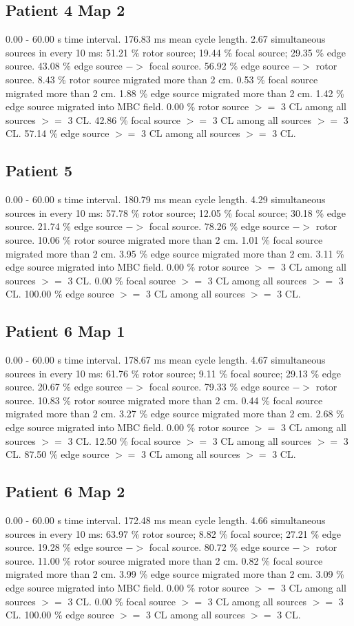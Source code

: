 \documentclass[journal,onecolumn]{IEEEtran} %
\begin{document}
\subsection{Patient 4 Map 2}
0.00 - 60.00 s time interval.
176.83 ms mean cycle length.
2.67 simultaneous sources in every 10 ms:
51.21 \% rotor source;
19.44 \% focal source;
29.35 \% edge source.
43.08 \% edge source $->$ focal source.
56.92 \% edge source $->$ rotor source.
8.43 \% rotor source migrated more than 2 cm.
0.53 \% focal source migrated more than 2 cm.
1.88 \% edge source migrated more than 2 cm.
1.42 \% edge source migrated into MBC field.
0.00 \% rotor source $>=$ 3 CL among all sources $>=$ 3 CL.
42.86 \% focal source $>=$ 3 CL among all sources $>=$ 3 CL.
57.14 \% edge source $>=$ 3 CL among all sources $>=$ 3 CL.

\subsection{Patient 5}
0.00 - 60.00 s time interval.
180.79 ms mean cycle length.
4.29 simultaneous sources in every 10 ms:
57.78 \% rotor source;
12.05 \% focal source;
30.18 \% edge source.
21.74 \% edge source $->$ focal source.
78.26 \% edge source $->$ rotor source.
10.06 \% rotor source migrated more than 2 cm.
1.01 \% focal source migrated more than 2 cm.
3.95 \% edge source migrated more than 2 cm.
3.11 \% edge source migrated into MBC field.
0.00 \% rotor source $>=$ 3 CL among all sources $>=$ 3 CL.
0.00 \% focal source $>=$ 3 CL among all sources $>=$ 3 CL.
100.00 \% edge source $>=$ 3 CL among all sources $>=$ 3 CL.

\subsection{Patient 6 Map 1}
0.00 - 60.00 s time interval.
178.67 ms mean cycle length.
4.67 simultaneous sources in every 10 ms:
61.76 \% rotor source;
9.11 \% focal source;
29.13 \% edge source.
20.67 \% edge source $->$ focal source.
79.33 \% edge source $->$ rotor source.
10.83 \% rotor source migrated more than 2 cm.
0.44 \% focal source migrated more than 2 cm.
3.27 \% edge source migrated more than 2 cm.
2.68 \% edge source migrated into MBC field.
0.00 \% rotor source $>=$ 3 CL among all sources $>=$ 3 CL.
12.50 \% focal source $>=$ 3 CL among all sources $>=$ 3 CL.
87.50 \% edge source $>=$ 3 CL among all sources $>=$ 3 CL.

\subsection{Patient 6 Map 2}
0.00 - 60.00 s time interval.
172.48 ms mean cycle length.
4.66 simultaneous sources in every 10 ms:
63.97 \% rotor source;
8.82 \% focal source;
27.21 \% edge source.
19.28 \% edge source $->$ focal source.
80.72 \% edge source $->$ rotor source.
11.00 \% rotor source migrated more than 2 cm.
0.82 \% focal source migrated more than 2 cm.
3.99 \% edge source migrated more than 2 cm.
3.09 \% edge source migrated into MBC field.
0.00 \% rotor source $>=$ 3 CL among all sources $>=$ 3 CL.
0.00 \% focal source $>=$ 3 CL among all sources $>=$ 3 CL.
100.00 \% edge source $>=$ 3 CL among all sources $>=$ 3 CL.
\end{document}

